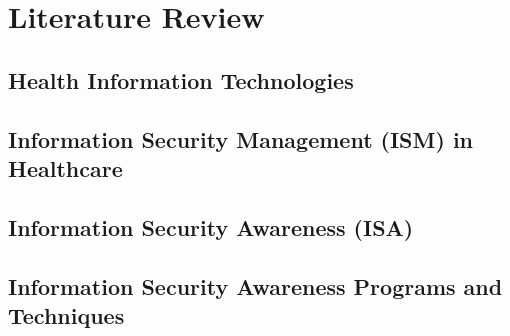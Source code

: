 \chapter{Literature Review}
\label{c:literatur}




\section{Health Information Technologies}
\label{c:literatur:summaries:info-sec-awa-helth}


\section{Information Security Management (ISM) in Healthcare }
\label{c:literatur:summaries:Information Security}


%

\section{Information Security Awareness (ISA)}
\label{c:literatur:summaries:info-sec-awa}


%

\section{Information Security Awareness Programs and Techniques }
\label{c:literatur:summaries:info-sec-awa-prog}



%